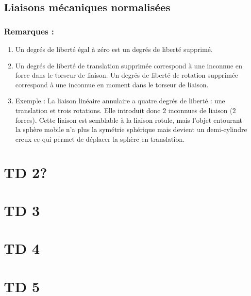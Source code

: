 \documentclass[
]{book}
\begin{document}
\hypertarget{liaisons-muxe9caniques-normalisuxe9es}{%
\section{Liaisons mécaniques normalisées}\label{liaisons-muxe9caniques-normalisuxe9es}}

\hypertarget{remarques}{%
\subsection{Remarques :}\label{remarques}}

\begin{enumerate}
\def\labelenumi{\arabic{enumi}.}
\item
  Un degrés de liberté égal à zéro est un degrés de liberté supprimé.
\item
  Un degrés de liberté de translation supprimée correspond à une inconnue en force dans le torseur de liaison.
  Un degrés de liberté de rotation supprimée correspond à une inconnue en moment dans le torseur de liaison.
\item
  Exemple : La liaison linéaire annulaire a quatre degrés de liberté : une translation et trois rotations. Elle introduit donc 2 inconnues de liaison (2 forces).
  Cette liaison est semblable à la liaison rotule, mais l'objet entourant la sphère mobile n'a plus la symétrie sphérique mais devient un demi-cylindre creux ce qui permet de déplacer la sphère en translation.
\end{enumerate}

\hypertarget{td-2}{%
\chapter{TD 2?}\label{td-2}}

\hypertarget{td-3}{%
\chapter{TD 3}\label{td-3}}

\hypertarget{td-4}{%
\chapter{TD 4}\label{td-4}}

\hypertarget{td-5}{%
\chapter{TD 5}\label{td-5}}
\end{document}
